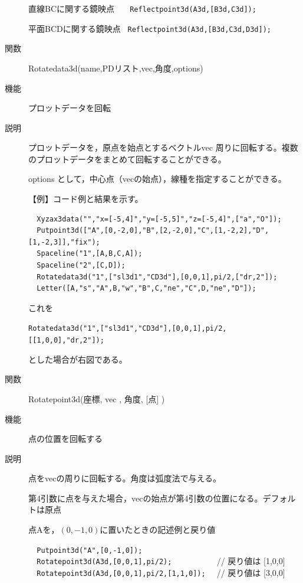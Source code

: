 \documentclass[papersize,a4paper,12pt,uplatex]{jsarticle}
\begin{document}
\begin{description}
直線BCに関する鏡映点  \verb|   Reflectpoint3d(A3d,[B3d,C3d]);|
    
平面BCDに関する鏡映点  \verb| Reflectpoint3d(A3d,[B3d,C3d,D3d]);|
 
    
\vspace{\baselineskip}
\hypertarget{rotatedata3d}{}
\item[関数]  Rotatedata3d(name,PDリスト,vec,角度,options)
\item[機能]  プロットデータを回転
\item[説明]  プロットデータを，原点を始点とするベクトルvec 周りに回転する。複数のプロットデータをまとめて回転することができる。

options として，中心点（vecの始点），線種を指定することができる。

\vspace{\baselineskip}
【例】コード例と結果を示す。
\begin{verbatim}
  Xyzax3data("","x=[-5,4]","y=[-5,5]","z=[-5,4]",["a","O"]);
  Putpoint3d(["A",[0,-2,0],"B",[2,-2,0],"C",[1,-2,2],"D",[1,-2,3]],"fix");
  Spaceline("1",[A,B,C,A]);
  Spaceline("2",[C,D]);
  Rotatedata3d("1",["sl3d1","CD3d"],[0,0,1],pi/2,["dr,2"]);
  Letter([A,"s","A",B,"w","B",C,"ne","C",D,"ne","D"]);
\end{verbatim}
これを

  \verb|Rotatedata3d("1",["sl3d1","CD3d"],[0,0,1],pi/2,[[1,0,0],"dr,2"]);|
  
とした場合が右図である。

  \hspace{5mm}  

\vspace{\baselineskip}
\hypertarget{rotatepoint3d}{}
\item[関数]  Rotatepoint3d(座標, vec , 角度, [点] )
\item[機能]  点の位置を回転する
\item[説明]  点をvecの周りに回転する。角度は弧度法で与える。

第4引数に点を与えた場合，vecの始点が第4引数の位置になる。デフォルトは原点

点Aを，$(0,-1,0)$に置いたときの記述例と戻り値
 
\verb|  Putpoint3d("A",[0,-1,0]);| \\
\verb|  Rotatepoint3d(A3d,[0,0,1],pi/2);          |  // 戻り値は [1,0,0]\\
\verb|  Rotatepoint3d(A3d,[0,0,1],pi/2,[1,1,0]);  | // 戻り値は [3,0,0]\\
 

\end{description}
\end{document}
